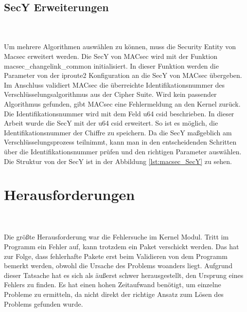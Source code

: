 \subsection{SecY Erweiterungen}\\
\\
Um mehrere Algorithmen auswählen zu können, muss die Security Entity von Macsec erweitert werden. Die \gls{SecY} von MACsec wird mit der Funktion macsec\_changelink\_common initialisiert. In dieser Funktion werden die Parameter von der iproute2 Konfiguration an die SecY von MACsec übergeben. Im Anschluss validiert \gls{MACsec} die überreichte Identifikationsnummer des Verschlüsselungsalgorithmus aus der Cipher Suite. Wird kein passender Algorithmus gefunden, gibt MACsec eine Fehlermeldung an den Kernel zurück. Die Identifikationsnummer wird mit dem Feld u64 csid beschrieben. 
In dieser Arbeit wurde die SecY mit der u64 csid erweitert. So ist es möglich, die Identifikationsnummer der Chiffre zu speichern. Da die SecY maßgeblich am Verschlüsselungsprozess teilnimmt, kann man in den entscheidenden Schritten über die Identifikationsnummer prüfen und den richtigen Parameter auswählen. Die Struktur von der SecY ist in der Abbildung \ref{lst:macsec_SecY} zu sehen.
\section{Herausforderungen}
\\
\\
Die größte Herausforderung war die Fehlersuche im Kernel Modul. Tritt im Programm ein Fehler auf, kann trotzdem ein Paket verschickt werden. Das hat zur Folge, dass fehlerhafte Pakete erst beim Validieren von dem Programm bemerkt werden, obwohl die Ursache des Problems woanders liegt. Aufgrund dieser Tatsache hat es sich als äußerst schwer herausgestellt, den Ursprung eines Fehlers zu finden. Es hat einen hohen Zeitaufwand benötigt, um einzelne Probleme zu ermitteln, da nicht direkt der richtige Ansatz zum Lösen des Problems gefunden wurde.
